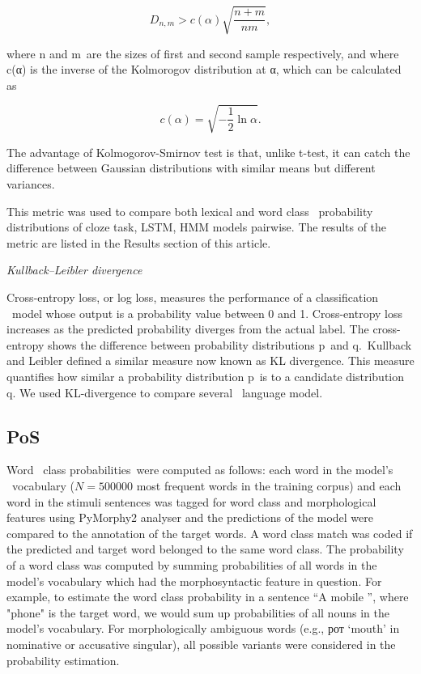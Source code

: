 \documentclass[a4paper]{article}
\newcommand{\head}[1]{\vspace{0.5em}\emph{#1}\vspace{0.25em}}
\begin{document}
\[ {D_{n,m}>c(\alpha ){\sqrt {\frac {n+m}{nm}}},} \]

where {n} and {m} are the sizes of first and second sample respectively, and where c(α) is the inverse of the Kolmorogov distribution at α, which can be calculated as 


\[ { c\left(\alpha \right)={\sqrt {-{\frac {1}{2}}\ln \alpha }}.} \]

The advantage of Kolmogorov-Smirnov test is that, unlike t-test, it can catch the difference between Gaussian distributions with similar means but different variances.

This metric was used to compare both lexical and word class
 probability distributions of cloze task, LSTM, HMM models pairwise. The results of the metric are listed in the Results section of this article.


\head{Kullback–Leibler divergence} %

Cross-entropy loss, or log loss, measures the performance of a classification
 model whose output is a probability value between 0 and 1. Cross-entropy loss increases as the predicted probability diverges from the actual label. The cross-entropy shows the difference between probability distributions p and q. Kullback and Leibler defined a similar measure now known as KL divergence. This measure quantifies how similar a probability distribution p is to a candidate distribution q. We used KL-divergence to compare several
 language model.

\subsection{PoS} %

Word
 class probabilities were computed as follows: each word in the model’s
 vocabulary (\(N = 500000\) most frequent words in the training corpus) and each word in the stimuli sentences was tagged for word class and morphological features using PyMorphy2 analyser 
\cite{korobov:2015}
and the predictions of the model were compared to the
annotation of the target words. A word class match was coded if the
predicted and target word belonged to the same word class. The
probability of a word class was computed by summing probabilities of
all words in the model’s vocabulary which had the morphosyntactic
feature in question. For example, to estimate the word class
probability in a sentence “A mobile \underline{\hspace{1em}}”, where "phone" is the target word, we would sum up probabilities of all nouns in the model’s vocabulary. For morphologically ambiguous words (e.g., рот ‘mouth’ in nominative or accusative singular), all possible variants were considered in the probability estimation.
\end{document}
